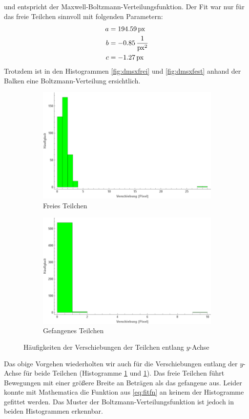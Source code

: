 \documentclass[a4paper,titlepage]{scrartcl}
\numberwithin{equation}{section}
\begin{document}
und entspricht der Maxwell-Boltzmann-Verteilungsfunktion. Der Fit war nur für das freie Teilchen sinnvoll mit folgenden Parametern:
\begin{align*}
a&=\unit[194.59]{px}\\
b&=\unit[-0.85]{\frac{1}{px^2}}\\
c&=\unit[-1.27]{px}\\
\end{align*}
Trotzdem ist in den Histogrammen \ref{fig:dmsxfrei} und \ref{fig:dmsxfest} anhand der Balken eine Boltzmann-Verteilung ersichtlich.
\begin{figure}[H]
\centering
\begin{subfigure}{.5\textwidth}
  \centering
  \includegraphics[width=.95\linewidth]{frei-y-dms.png}
  \caption{Freies Teilchen}
  \label{fig:dmsyfrei}
\end{subfigure}%
\begin{subfigure}{.5\textwidth}
  \centering
  \includegraphics[width=.95\linewidth]{fest-y-dms.png}
  \caption{Gefangenes Teilchen}
  \label{fig:dmsyfest}
\end{subfigure}
\caption{Häufigkeiten der Verschiebungen der Teilchen entlang $y$-Achse}
\label{fig:dmsy}
\end{figure}
Das obige Vorgehen wiederholten wir auch für die Verschiebungen entlang der $y$-Achse für beide Teilchen (Histogramme \ref{fig:dmsyfrei} und \ref{fig:dmsyfrei}). Das freie Teilchen führt Bewegungen mit einer größere Breite an Beträgen als das gefangene aus. Leider konnte mit Mathematica die Funktion aus \ref{eq:fitfn} an keinem der Histogramme gefittet werden. Das Muster der Boltzmann-Verteilungsfunktion ist jedoch in beiden Histogrammen erkennbar.
\end{document}
